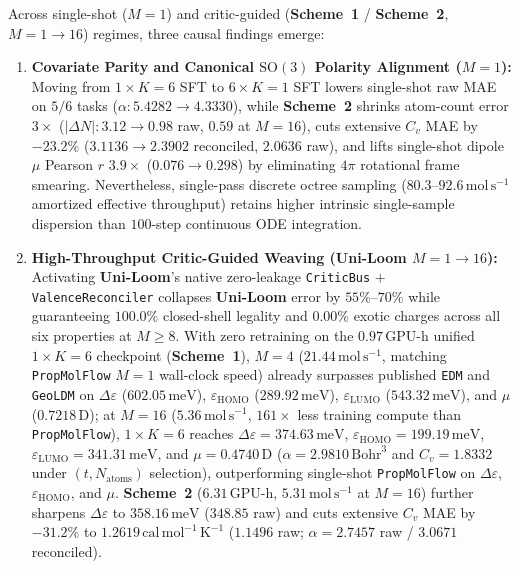 \documentclass[11pt,a4paper]{article}
\begin{document}
Across single-shot ($M=1$) and critic-guided (\textbf{Scheme~1} / \textbf{Scheme~2}, $M=1\to 16$) regimes, three causal findings emerge:
\begin{enumerate}[leftmargin=1.5em,itemsep=2pt,topsep=2pt]
    \item \textbf{Covariate Parity and Canonical $\text{SO}(3)$ Polarity Alignment ($M=1$):} Moving from $1\times K=6$ SFT to $6\times K=1$ SFT lowers single-shot raw MAE on $5/6$ tasks ($\alpha: 5.4282 \to 4.3330$), while \textbf{Scheme~2} shrinks atom-count error $3\times$ ($|\Delta N|: 3.12 \to 0.98$ raw, $0.59$ at $M=16$), cuts extensive $C_v$ MAE by $-23.2\%$ ($3.1136 \to 2.3902$ reconciled, $2.0636$ raw), and lifts single-shot dipole $\mu$ Pearson $r$ $3.9\times$ ($0.076 \to 0.298$) by eliminating $4\pi$ rotational frame smearing. Nevertheless, single-pass discrete octree sampling ($80.3\text{--}92.6\,\text{mol}\,\text{s}^{-1}$ amortized effective throughput) retains higher intrinsic single-sample dispersion than $100$-step continuous ODE integration.
    \item \textbf{High-Throughput Critic-Guided Weaving (\textbf{Uni-Loom} $M=1 \to 16$):} Activating \textbf{Uni-Loom}'s native zero-leakage \texttt{CriticBus} $+$ \texttt{ValenceReconciler} collapses \textbf{Uni-Loom} error by $55\%\text{--}70\%$ while guaranteeing $100.0\%$ closed-shell legality and $0.00\%$ exotic charges across all six properties at $M\ge 8$. With zero retraining on the $0.97\,\text{GPU-h}$ unified $1\times K=6$ checkpoint (\textbf{Scheme~1}), $M=4$ ($21.44\,\text{mol}\,\text{s}^{-1}$, matching \texttt{PropMolFlow} $M=1$ wall-clock speed) already surpasses published \texttt{EDM} and \texttt{GeoLDM} on $\Delta\varepsilon$ ($602.05\,\text{meV}$), $\varepsilon_{\text{HOMO}}$ ($289.92\,\text{meV}$), $\varepsilon_{\text{LUMO}}$ ($543.32\,\text{meV}$), and $\mu$ ($0.7218\,\text{D}$); at $M=16$ ($5.36\,\text{mol}\,\text{s}^{-1}$, $161\times$ less training compute than \texttt{PropMolFlow}), $1\times K=6$ reaches $\Delta\varepsilon=374.63\,\text{meV}$, $\varepsilon_{\text{HOMO}}=199.19\,\text{meV}$, $\varepsilon_{\text{LUMO}}=341.31\,\text{meV}$, and $\mu=0.4740\,\text{D}$ ($\alpha=2.9810\,\text{Bohr}^3$ and $C_v=1.8332$ under $(t,N_{\text{atoms}})$ selection), outperforming single-shot \texttt{PropMolFlow} on $\Delta\varepsilon$, $\varepsilon_{\text{HOMO}}$, and $\mu$. \textbf{Scheme~2} ($6.31\,\text{GPU-h}$, $5.31\,\text{mol}\,\text{s}^{-1}$ at $M=16$) further sharpens $\Delta\varepsilon$ to $358.16\,\text{meV}$ ($348.85$ raw) and cuts extensive $C_v$ MAE by $-31.2\%$ to $1.2619\,\text{cal}\,\text{mol}^{-1}\,\text{K}^{-1}$ ($1.1496$ raw; $\alpha=2.7457$ raw / $3.0671$ reconciled).

\end{enumerate}
\end{document}
